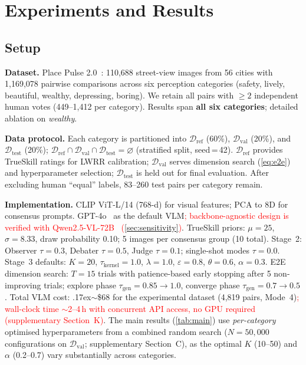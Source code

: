 \documentclass[runningheads]{llncs}
\begin{document}
\section{Experiments and Results}
\label{sec:exp}

\subsection{Setup}

\noindent\textbf{Dataset.}
Place Pulse 2.0~\cite{salesses2013collaborative}: 110,688 street-view images from 56 cities with 1,169,078 pairwise comparisons across six perception categories (safety, lively, beautiful, wealthy, depressing, boring).
We retain all pairs with ${\geq}2$ independent human votes (449--1,412 per category).
Results span \textbf{all six categories}; detailed ablation on \emph{wealthy}.

\smallskip\noindent\textbf{Data protocol.}
Each category is partitioned into $\mathcal{D}_{\mathrm{ref}}$ (60\%), $\mathcal{D}_{\mathrm{val}}$ (20\%), and $\mathcal{D}_{\mathrm{test}}$ (20\%); $\mathcal{D}_{\mathrm{ref}} \cap \mathcal{D}_{\mathrm{val}} \cap \mathcal{D}_{\mathrm{test}} = \varnothing$ (stratified split, seed\,=\,42).
$\mathcal{D}_{\mathrm{ref}}$ provides TrueSkill ratings for LWRR calibration; $\mathcal{D}_{\mathrm{val}}$ serves dimension search (\cref{eq:e2e}) and hyperparameter selection; $\mathcal{D}_{\mathrm{test}}$ is held out for final evaluation.
After excluding human ``equal'' labels, 83--260 test pairs per category remain.

\smallskip\noindent\textbf{Implementation.}
CLIP ViT-L/14 (768-d) for visual features; PCA to 8D for consensus prompts.
GPT-4o~\cite{openai2024gpt4o} as the default VLM\textcolor{red}{; backbone-agnostic design is verified with Qwen2.5-VL-72B~\cite{bai2025qwen25vl} (\cref{sec:sensitivity})}.
TrueSkill priors: $\mu{=}25$, $\sigma{=}8.33$, draw probability 0.10; 5 images per consensus group (10 total).
Stage~2: Observer $\tau{=}0.3$, Debater $\tau{=}0.5$, Judge $\tau{=}0.1$; single-shot modes $\tau{=}0.0$.
Stage~3 defaults: $K{=}20$, $\tau_{\mathrm{kernel}}{=}1.0$, $\lambda{=}1.0$, $\varepsilon{=}0.8$, $\theta{=}0.6$, $\alpha{=}0.3$.
E2E dimension search: $T{=}15$ trials with patience-based early stopping after 5 non-improving trials; explore phase $\tau_{\mathrm{gen}}{=}0.85{\to}1.0$, converge phase $\tau_{\mathrm{gen}}{=}0.7{\to}0.5$.
Total VLM cost: {\raise.17ex\hbox{$\scriptstyle\sim$}}\$68 for the experimental dataset (4,819 pairs, Mode~4)\textcolor{red}{; wall-clock time ${\sim}$2--4\,h with concurrent API access, no GPU required (supplementary Section~K)}.
The main results (\cref{tab:main}) use \emph{per-category} optimised hyperparameters from a combined random search ($N{=}50{,}000$ configurations on $\mathcal{D}_{\mathrm{val}}$; supplementary Section~C), as the optimal $K$ (10--50) and $\alpha$ (0.2--0.7) vary substantially across categories.
\end{document}
